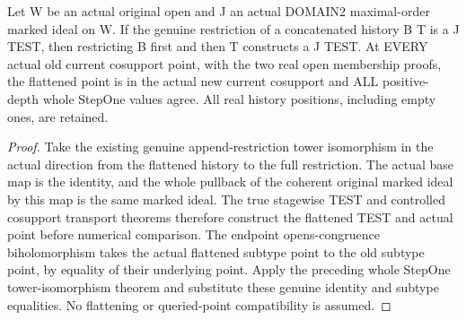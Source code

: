 \begin{theorem}
\label{hir:original-bound-two-stepone-restrict-append-values}
\leanok
Let W be an actual original open and J an actual DOMAIN2 maximal-order
marked ideal on W. If the genuine restriction of a concatenated history
B T is a J TEST, then restricting B first and then T constructs a J TEST.
At EVERY actual old current cosupport point, with the two real open
membership proofs, the flattened point is in the actual new current
cosupport and ALL positive-depth whole StepOne values agree. All real
history positions, including empty ones, are retained.
\end{theorem}
\begin{proof}
Take the existing genuine append-restriction tower isomorphism in the
actual direction from the flattened history to the full restriction.
The actual base map is the identity, and the whole pullback of the
coherent original marked ideal by this map is the same marked ideal.
The true stagewise TEST and controlled cosupport transport theorems
therefore construct the flattened TEST and actual point before numerical
comparison. The endpoint opens-congruence biholomorphism takes the actual
flattened subtype point to the old subtype point, by equality of their
underlying point. Apply the preceding whole StepOne tower-isomorphism
theorem and substitute these genuine identity and subtype equalities.
No flattening or queried-point compatibility is assumed.
\end{proof}

